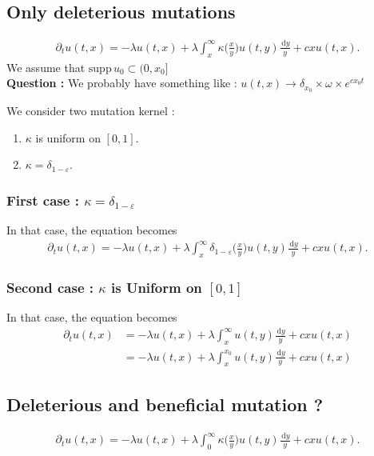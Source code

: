 \documentclass{article}
\newcommand{\diff}{\,\mathrm{d}}
\begin{document}
\subsection{Only deleterious mutations}
\begin{align*}
    \partial_t u(t,x) = -\lambda u(t,x) + \lambda \int_x^\infty \kappa\Big(\frac{x}{y}\Big)u(t,y)\frac{\diff y}{y} + cxu(t,x).
\end{align*} 
We assume that $\text{supp}\,u_0 \subset (0, x_0]$\\

\textbf{Question :} We probably have something like : $u(t,x) \to \delta_{x_0} \times \omega \times e^{cx_0t}$

We consider two mutation kernel : 
\begin{enumerate}
    \item $\kappa$ is uniform on $[0,1]$.
    \item $\kappa = \delta_{1-\varepsilon}$.
\end{enumerate}

\subsubsection{First case : $\kappa = \delta_{1-\varepsilon}$}

In that case, the equation becomes 
\begin{align*}
    \partial_t u(t,x) = -\lambda u(t,x) + \lambda \int_x^\infty \delta_{1-\varepsilon}\Big(\frac{x}{y}\Big)u(t,y)\frac{\diff y}{y} + cxu(t,x).
\end{align*} 

\subsubsection{Second case : $\kappa$ is Uniform on $[0, 1]$}

In that case, the equation becomes 
\begin{align*}
    \partial_t u(t,x)
    &= -\lambda u(t,x) + \lambda \int_x^\infty u(t,y)\frac{\diff y}{y} + cxu(t,x) \\
    &= -\lambda u(t,x) + \lambda \int_x^{x_0} u(t,y)\frac{\diff y}{y} + cxu(t,x)
\end{align*} 


\subsection{Deleterious and beneficial mutation ? }
\begin{align*}
    \partial_t u(t,x) = -\lambda u(t,x) + \lambda \int_0^\infty \kappa\Big(\frac{x}{y}\Big)u(t,y)\frac{\diff y}{y} + cxu(t,x).
\end{align*} 
\end{document}
